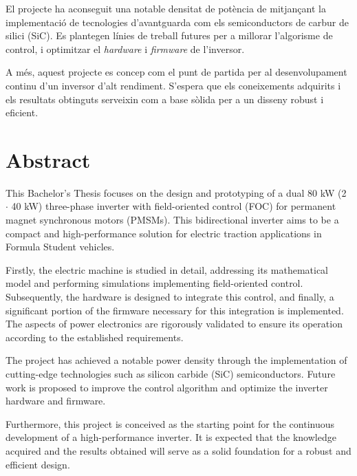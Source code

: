 El projecte ha aconseguit una notable densitat de potència de mitjançant la implementació de tecnologies d'avantguarda com els semiconductors de carbur de silici (SiC). Es plantegen línies de treball futures per a millorar l'algorisme de control, i optimitzar el \textit{hardware} i \textit{firmware} de l'inversor.

A més, aquest projecte es concep com el punt de partida per al desenvolupament continu d'un inversor d'alt rendiment. S'espera que els coneixements adquirits i els resultats obtinguts serveixin com a base sòlida per a un disseny robust i eficient.


\chapter*{Abstract}
This Bachelor's Thesis focuses on the design and prototyping of a dual 80 kW (2 $\cdot$ 40 kW) three-phase inverter with field-oriented control (FOC) for permanent magnet synchronous motors (PMSMs). This bidirectional inverter aims to be a compact and high-performance solution for electric traction applications in Formula Student vehicles.

Firstly, the electric machine is studied in detail, addressing its mathematical model and performing simulations implementing field-oriented control. Subsequently, the hardware is designed to integrate this control, and finally, a significant portion of the firmware necessary for this integration is implemented. The aspects of power electronics are rigorously validated to ensure its operation according to the established requirements.

The project has achieved a notable power density through the implementation of cutting-edge technologies such as silicon carbide (SiC) semiconductors. Future work is proposed to improve the control algorithm and optimize the inverter hardware and firmware.

Furthermore, this project is conceived as the starting point for the continuous development of a high-performance inverter. It is expected that the knowledge acquired and the results obtained will serve as a solid foundation for a robust and efficient design.